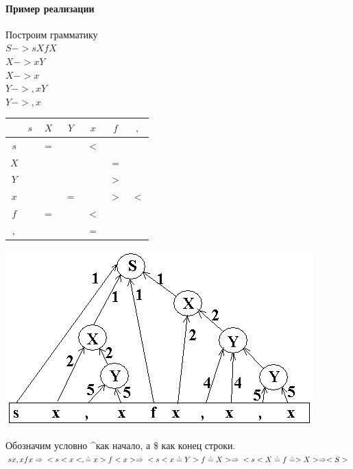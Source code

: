 \documentclass[a4paper,12pt]{article}
\begin{document}
\paragraph{Пример реализации}
Построим грамматику \\
$S -> sXfX$\\
$X -> xY$\\
$X -> x$\\
$Y -> ,xY$\\
$Y -> ,x$\\

\begin{tabular}[l]{c|cccccc}
    & $s$ & $X$ & $Y$ & $x$ & $f$ & $,$ \\
\hline
$s$ &     & $=$ &     & $<$ &     &     \\
$X$ &     &     &     &     & $=$ &     \\
$Y$ &     &     &     &     & $>$ &     \\
$x$ &     &     & $=$ &     & $>$ & $<$ \\
$f$ &     & $=$ &     & $<$ &     &     \\
$,$ &     &     &     & $=$ &     &     \\
\end{tabular}

\includegraphics[scale=1.0]{lab4.png}\vspace{1em}

Обозначим условно \textasciicircum как начало, а \$ как конец строки.\\
\begin{math}
sx,xfx => \\
<s<x<, \doteq x>f<x> => \\
<s<x \doteq Y>f \doteq X> => \\
<s<X \doteq f \doteq >X> => <S>
\end{math}\\
\end{document}

